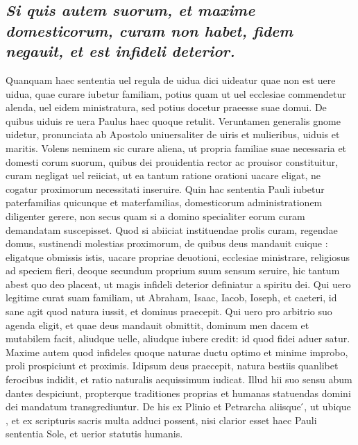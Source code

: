 \documentclass{article}
\begin{document}
\begin{pages}
\subsection*{\textit{Si quis autem suorum, et maxime domesticorum, curam non habet, fidem negauit, et est infideli deterior. }}\pstart Quanquam haec sententia uel regula de uidua dici uideatur quae non est uere uidua, quae curare iubetur familiam, potius quam ut uel ecclesiae commendetur alenda, uel eidem ministratura, sed potius docetur praeesse suae domui. De quibus uiduis re uera Paulus haec quoque retulit. Veruntamen generalis gnome uidetur, pronunciata ab Apostolo uniuersaliter de uiris et mulieribus, uiduis et maritis. Volens neminem sic curare aliena, ut propria familiae suae necessaria et domesti corum suorum, quibus dei prouidentia rector ac prouisor constituitur, curam negligat uel reiiciat, ut ea tantum ratione orationi uacare eligat, ne cogatur proximorum necessitati inseruire. Quin hac sententia Pauli iubetur paterfamilias quicunque et materfamilias, domesticorum administrationem diligenter gerere, non secus quam si a domino specialiter eorum curam demandatam suscepisset. Quod si abiiciat instituendae prolis curam, regendae domus, sustinendi molestias proximorum, de quibus deus mandauit cuique : eligatque obmissis istis, uacare propriae deuotioni, ecclesiae ministrare, religiosus ad speciem fieri, deoque secundum proprium suum sensum seruire, hic tantum abest quo deo placeat, ut magis infideli deterior definiatur a spiritu dei. Qui uero legitime curat suam familiam, ut Abraham, Isaac, Iacob, Ioseph, et caeteri, id sane agit quod natura iussit, et dominus praecepit. Qui uero pro arbitrio suo agenda eligit, et quae deus mandauit obmittit, dominum men dacem et mutabilem facit, aliudque uelle, aliudque iubere credit: id quod fidei aduer satur. Maxime autem quod infideles quoque naturae ductu optimo et minime improbo, proli prospiciunt et proximis. Idipsum deus praecepit, natura bestiis quanlibet ferocibus indidit, et ratio naturalis aequissimum iudicat. Illud hii suo sensu abum dantes despiciunt, propterque traditiones proprias et humanas statuendas domini dei mandatum transgrediuntur. De his ex Plinio et Petrarcha aliisque ́, ut ubique , et ex scripturis sacris multa adduci possent, nisi clarior esset haec Pauli sententia Sole, et uerior statutis humanis.  \pend
{}
{}

\end{pages}
\end{document}
